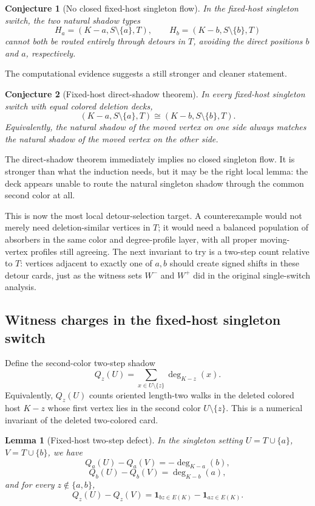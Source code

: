 \documentclass[11pt]{article}
\newtheorem{lemma}{Lemma}
\newtheorem{conjecture}{Conjecture}
\newcommand{\one}{\mathbf{1}}
\begin{document}
\begin{conjecture}[No closed fixed-host singleton flow]
In the fixed-host singleton switch, the two natural shadow types
\[
  H_a=(K-a,S\setminus\{a\},T),
  \qquad
  H_b=(K-b,S\setminus\{b\},T)
\]
cannot both be routed entirely through detours in \(T\), avoiding the direct
positions \(b\) and \(a\), respectively.
\end{conjecture}

The computational evidence suggests a still stronger and cleaner statement.

\begin{conjecture}[Fixed-host direct-shadow theorem]
In every fixed-host singleton switch with equal colored deletion decks,
\[
  (K-a,S\setminus\{a\},T)
  \cong
  (K-b,S\setminus\{b\},T).
\]
Equivalently, the natural shadow of the moved vertex on one side always
matches the natural shadow of the moved vertex on the other side.
\end{conjecture}

The direct-shadow theorem immediately implies no closed singleton flow.  It
is stronger than what the induction needs, but it may be the right local
lemma: the deck appears unable to route the natural singleton shadow through
the common second color at all.

This is now the most local detour-selection target.  A counterexample would
not merely need deletion-similar vertices in \(T\); it would need a balanced
population of absorbers in the same color and degree-profile layer, with all
proper moving-vertex profiles still agreeing.  The next invariant to try is a
two-step count relative to \(T\): vertices adjacent to exactly one of \(a,b\)
should create signed shifts in these detour cards, just as the witness sets
\(W^-\) and \(W^+\) did in the original single-switch analysis.

\subsection{Witness charges in the fixed-host singleton switch}

Define the second-color two-step shadow
\[
  Q_z(U)=\sum_{x\in U\setminus\{z\}}\deg_{K-z}(x).
\]
Equivalently, \(Q_z(U)\) counts oriented length-two walks in the deleted
colored host \(K-z\) whose first vertex lies in the second color
\(U\setminus\{z\}\).  This is a numerical invariant of the deleted
two-colored card.

\begin{lemma}[Fixed-host two-step defect]
In the singleton setting \(U=T\cup\{a\}\), \(V=T\cup\{b\}\), we have
\[
  Q_a(U)-Q_a(V)=-\deg_{K-a}(b),
\]
\[
  Q_b(U)-Q_b(V)=\deg_{K-b}(a),
\]
and for every \(z\notin\{a,b\}\),
\[
  Q_z(U)-Q_z(V)=\one_{bz\in E(K)}-\one_{az\in E(K)}.
\]
\end{lemma}
\end{document}
